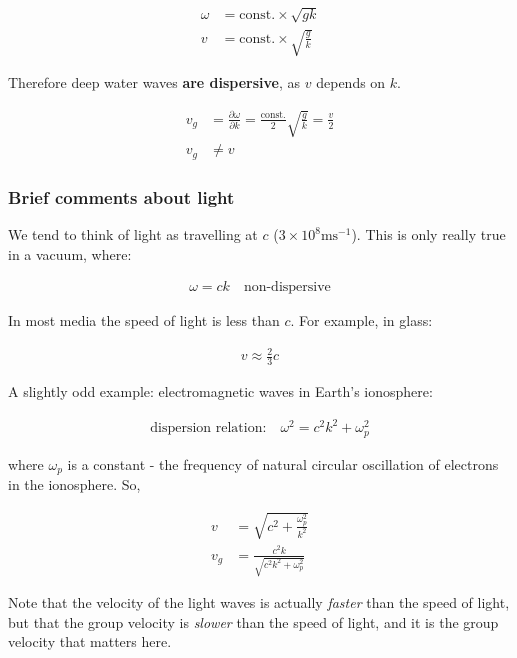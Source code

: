 \documentclass[10pt,a4paper]{article}
\begin{document}
\begin{align*}
\omega &= \text{const.} \times \sqrt{gk} \\
v &= \text{const.} \times \sqrt{\frac{g}{k}}
\end{align*}

Therefore deep water waves \textbf{are dispersive}, as $v$ depends on $k$.

\begin{align*}
v_g &= \frac{\partial \omega}{\partial k} = \frac{\text{const.}}{2} \sqrt{\frac{g}{k}} = \frac{v}{2} \\
v_g &\neq v
\end{align*}

\subsubsection*{Brief comments about light}

We tend to think of light as travelling at $c$ ($3 \times 10^8 \mathrm{ms^{-1}}$). This is only really true in a vacuum, where:

\begin{align*}
\omega = ck \quad \text{non-dispersive}
\end{align*}

In most media the speed of light is less than $c$. For example, in glass:

\begin{align*}
v \approx \frac{2}{3} c
\end{align*}

A slightly odd example: electromagnetic waves in Earth's ionosphere:

\begin{align*}
\text{dispersion relation:} \quad \omega^2 = c^2 k^2 + \omega_p^2
\end{align*}

where $\omega_p$ is a constant - the frequency of natural circular oscillation of electrons in the ionosphere. So,

\begin{align*}
v &= \sqrt{c^2 + \frac{\omega_p^2}{k^2}} \\
v_g &= \frac{c^2 k}{\sqrt{c^2 k^2 + \omega_p^2}}
\end{align*}

Note that the velocity of the light waves is actually \textit{faster} than the speed of light, but that the group velocity is \textit{slower} than the speed of light, and it is the group velocity that matters here.
\end{document}
